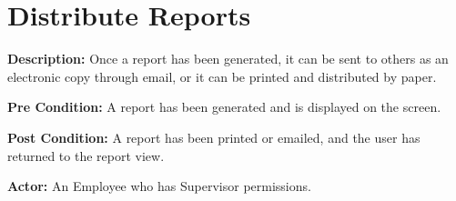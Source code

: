 \documentclass[letterpaper,12pt]{report}
\begin{document}
\section{Distribute Reports}
\begin{description}
 \item \textbf{Description:} \newline Once a report has been generated, it can be sent to others as an electronic copy through email, or it can be printed and distributed by paper.
 \item \textbf{Pre Condition:} \newline A report has been generated and is displayed on the screen.
 \item \textbf{Post Condition:} \newline  A report has been printed or emailed, and the user has returned to the report view.
 \item \textbf{Actor:} \newline An Employee who has Supervisor permissions.
\end{description}
\end{document}
